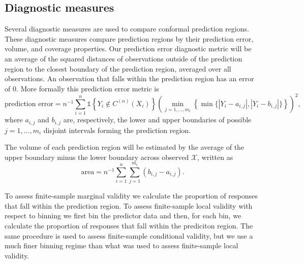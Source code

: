 \documentclass[11pt]{article}\usepackage[]{graphicx}\usepackage[]{color}
\newcommand{\Copt}{C^{(\alpha)}}
\newcommand{\X}{\mathcal{X}}
\newcommand{\indicator}[1]{\mathds{1}\left\{ #1 \right\}}
\begin{document}
\subsection{Diagnostic measures}

Several diagnostic measures are used to compare conformal prediction regions.
These diagnostic measures compare prediction regions by their 
prediction error, volume, and coverage properties.
Our prediction error diagnostic metric will be an average of the squared 
distances of observations outside of the prediction region to the closest 
boundary of the prediction region, averaged over all 
observations. An observation that falls within the prediction region 
has an error of 0.  More formally this prediction error metric is 
\[ 
  \text{prediction error} 
    = n^{-1}\sum_{i=1}^n\indicator{Y_i \not\in \Copt(X_i)}
      \left(\min_{j=1,\ldots,m_i}\left\{\min\{|Y_i - a_{i,j}|, 
        |Y_i - b_{i,j}|\}\right\}\right)^2,
 \]
where $a_{i,j}$ and $b_{i,j}$ are, respectively, the lower and upper 
boundaries of possible $j = 1, \ldots, m_i$ disjoint intervals forming 
the prediction region.  

The volume of each prediction region will be estimated by the average of the 
upper boundary minus the lower boundary across observed $\X$, written as
$$ 
  \text{area} = n^{-1}\sum_{i=1}^n\sum_{j=1}^{m_i}(b_{i,j} - a_{i,j}).
$$


To assess finite-sample marginal validity we calculate the proportion of 
responses that fall within the prediction region.  To assess finite-sample 
local validity with respect to binning we first bin the predictor data and 
then, for each bin, we calculate the proportion of responses that fall 
within the prediciton region. The same procedure is used to assess 
finite-sample conditional validity, but we use a much finer binning regime 
than what was used to assess finite-sample local validity.  
\end{document}
